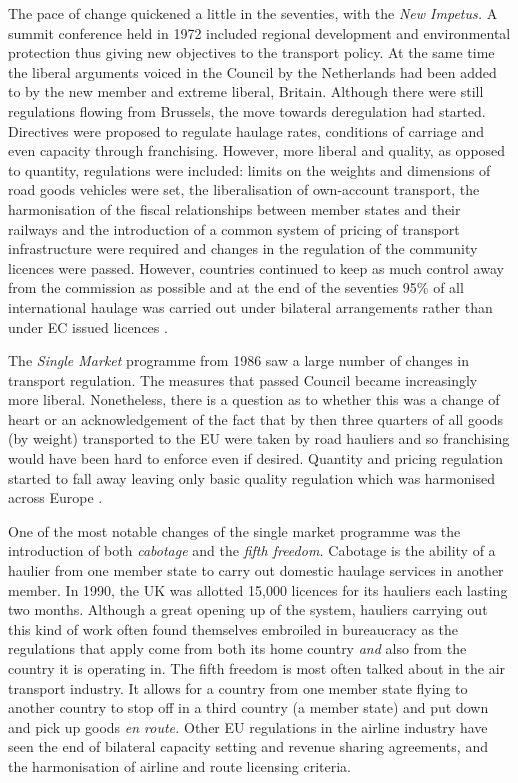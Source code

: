 The pace of change quickened a little in the seventies, with the \textit{New Impetus.} A summit conference held in 1972 included regional development and environmental protection thus giving new objectives to the transport policy. At the same time the liberal arguments voiced in the Council by the Netherlands had been added to by the new member and extreme liberal, Britain. Although there were still regulations flowing from Brussels, the move towards deregulation had started. Directives were proposed to regulate haulage rates, conditions of carriage and even capacity through franchising. However, more liberal and quality, as opposed to quantity, regulations were included: limits on the weights and dimensions of road goods vehicles were set, the liberalisation of own-account transport, the harmonisation of the fiscal relationships between member states and their railways and the introduction of a common system of pricing of transport infrastructure were required and changes in the regulation of the community licences were passed. However, countries continued to keep as much control away from the commission as possible and at the end of the seventies 95\% of all international haulage was carried out under bilateral arrangements rather than under EC issued licences \citep{Swann:1992}.

The \textit{Single Market} programme from 1986 saw a large number of changes in transport regulation. The measures that passed Council became increasingly more liberal. Nonetheless, there is a question as to whether this was a change of heart or an acknowledgement of the fact that by then three quarters of all goods (by weight) transported to the EU were taken by road hauliers and so franchising would have been hard to enforce even if desired. Quantity and pricing regulation started to fall away leaving only basic quality regulation which was harmonised across Europe \citep{TNT:1990}.

One of the most notable changes of the single market programme was the introduction of both \textit{cabotage} and the \textit{fifth freedom.} Cabotage is the ability of a haulier from one member state to carry out domestic haulage services in another member. In 1990, the UK was allotted 15,000 licences for its hauliers each lasting two months. Although a great opening up of the system, hauliers carrying out this kind of work often found themselves embroiled in bureaucracy as the regulations that apply come from both its home country \textit{and} also from the country it is operating in. The fifth freedom is most often talked about in the air transport industry. It allows for a country from one member state flying to another country to stop off in a third country (a member state) and put down and pick up goods \textit{en route.} Other EU regulations in the airline industry have seen the end of bilateral capacity setting and revenue sharing agreements, and the harmonisation of airline and route licensing criteria.

